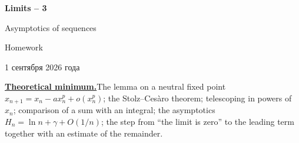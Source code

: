 \documentclass[11pt,a4paper]{article}
\begin{document}
\begin{center}
{\huge\bfseries Limits -- 3\par}\vspace{1.07em}
{\Large Asymptotics of sequences\par}\vspace{1.1em}
{\Large Homework\par}\vspace{1.1em}
{\foreignlanguage{russian}{1 сентября 2026 года}\par}
\end{center}\vspace{0pt}

\noindent\textbf{\underline{Theoretical minimum.}}\quad The lemma on a neutral fixed point
$x_{n+1}=x_n-ax_n^p+o(x_n^p)$; the Stolz--Ces\`aro theorem; telescoping in powers of $x_n$;
comparison of a sum with an integral; the asymptotics $H_n=\ln n+\gamma+O(1/n)$; the step from
``the limit is zero'' to the leading term together with an estimate of the remainder.
\end{document}
